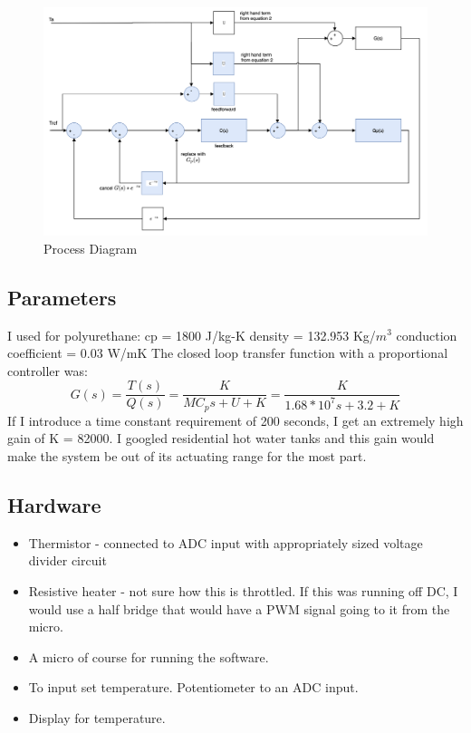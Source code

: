 \begin{figure}[h!]
  \includegraphics[width=\textwidth]{control_diagram}
  \caption{Process Diagram}
\end{figure}

\subsection *{Parameters}
I used for polyurethane:
cp = 1800 J/kg-K
density = 132.953 Kg/$m^3$
conduction coefficient = 0.03 W/mK
\noindent
The closed loop transfer function with a proportional controller was:
\begin{equation}
G(s) = \frac{T(s)}{Q(s)} = \frac{K}{M C_p s + U + K} = \frac{K}{1.68 *10^7 s + 3.2 + K}
\end{equation}
\noindent
If I introduce a time constant requirement of 200 seconds, I get an extremely high gain of K = 82000. I googled residential hot water tanks and this gain would make the system be out of its actuating range for the most part.

\subsection *{Hardware}
\begin{itemize}
  \item Thermistor - connected to ADC input with appropriately sized voltage divider circuit
  \item Resistive heater - not sure how this is throttled. If this was running off DC, I would use a half bridge that would have a PWM signal going to it from the micro.
  \item A micro of course for running the software.
  \item To input set temperature. Potentiometer to an ADC input.
  \item Display for temperature.
\end{itemize}
